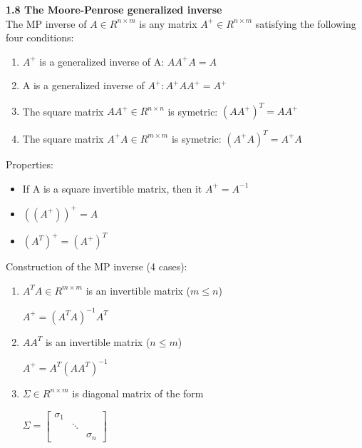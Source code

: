 \documentclass{article}
\begin{document}
\begin{multicols}{2}
	\textbf{1.8 The Moore-Penrose generalized inverse}\\
	The MP inverse of $A \in R^{n \times m}$ is any matrix
	$A^+ \in R^{n \times m}$ satisfying the following four conditions:
	\begin{enumerate}
		\item $A^+$ is a generalized inverse of A: $AA^+A = A$
		\item A is a generalized inverse of $A^+: A^+AA^+ = A^+$
		\item The square matrix $AA^+ \in R^{n \times n}$ is symetric: $(AA^+)^T = AA^+$
		\item The square matrix $A^+A \in R^{m \times m}$ is symetric: $(A^+A)^T = A^+A$
	\end{enumerate}
	Properties:
	\begin{itemize}
		\item If A is a square invertible matrix, then it $A^+ = A^{-1}$
		\item $((A^+))^+ = A$
		\item $(A^T)^+ = (A^+)^T$
	\end{itemize}
	Construction of the MP inverse (4 cases):
	\begin{enumerate}
		\item $A^TA \in R^{m \times m}$ is an invertible matrix ($m \leq n$)
		      \begin{center}
			      \begin{math}
				      A^+ = (A^TA)^{-1}A^T
			      \end{math}
		      \end{center}
		\item $AA^T$ is an invertible matrix ($n \leq m$)
		      \begin{center}
			      \begin{math}
				      A^+ = A^T(AA^T)^{-1}
			      \end{math}
		      \end{center}
		\item $\Sigma \in R^{n \times m}$ is diagonal matrix of the form
		      \begin{center}
			      \begin{math}
				      \Sigma =
				      \begin{bmatrix}
					      \sigma_1 &        &          \\
					               & \ddots &          \\
					               &        & \sigma_n
				      \end{bmatrix}
			      \end{math}

\end{center}
\end{enumerate}
\end{multicols}
\end{document}
